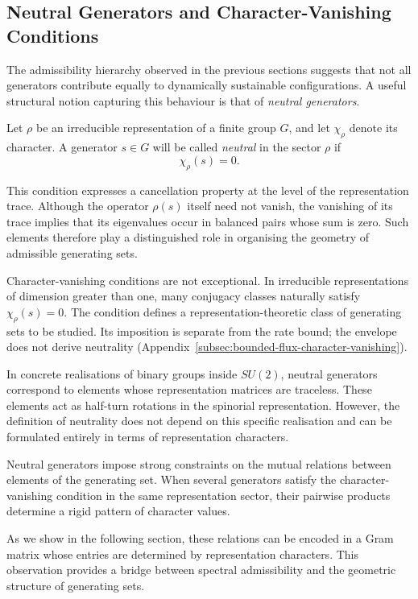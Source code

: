 \subsection{Neutral Generators and Character-Vanishing Conditions}
  \label{subsec:neutral-generators}

  The admissibility hierarchy observed in the previous sections suggests that
  not all generators contribute equally to dynamically sustainable
  configurations.
  A useful structural notion capturing this behaviour is that of
  \emph{neutral generators}.

  Let $\rho$ be an irreducible representation of a finite group $G$, and let
  $\chi_\rho$ denote its character.
  A generator $s\in G$ will be called \emph{neutral} in the sector $\rho$ if
  \begin{equation}
    \chi_\rho(s)=0 .
  \end{equation}

  This condition expresses a cancellation property at the level of the
  representation trace.
  Although the operator $\rho(s)$ itself need not vanish, the vanishing of its
  trace implies that its eigenvalues occur in balanced pairs whose sum is zero.
  Such elements therefore play a distinguished role in organising the geometry
  of admissible generating sets.

  Character-vanishing conditions are not exceptional.
  In irreducible representations of dimension greater than one, many conjugacy
  classes naturally satisfy $\chi_\rho(s)=0$.
  The condition defines a representation-theoretic class of generating sets to be studied.
  Its imposition is separate from the rate bound; the envelope does not derive neutrality
  (Appendix~\ref{subsec:bounded-flux-character-vanishing}).

  In concrete realisations of binary groups inside $SU(2)$, neutral generators
  correspond to elements whose representation matrices are traceless.
  These elements act as half-turn rotations in the spinorial representation.
  However, the definition of neutrality does not depend on this specific
  realisation and can be formulated entirely in terms of representation
  characters.

  Neutral generators impose strong constraints on the mutual relations between
  elements of the generating set.
  When several generators satisfy the character-vanishing condition in the same
  representation sector, their pairwise products determine a rigid pattern of
  character values.

  As we show in the following section, these relations can be encoded in a Gram
  matrix whose entries are determined by representation characters.
  This observation provides a bridge between spectral admissibility and the
  geometric structure of generating sets.
